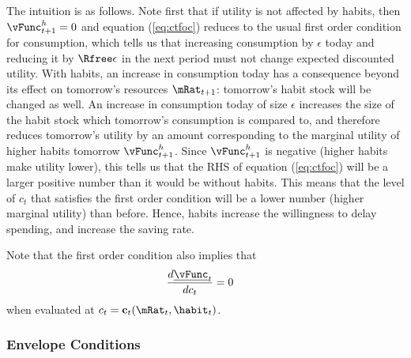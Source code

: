 The intuition is as follows.  Note first that if
utility is not affected by habits, then $\vFunc^{h}_{t+1}=0$ and equation
(\ref{eq:ctfoc}) reduces to the usual first order condition for
consumption, which tells us that increasing consumption by $\epsilon$
today and reducing it by $\Rfree \epsilon$ in the next period must not
change expected discounted utility.  With habits, an increase in
consumption today has a consequence beyond its effect on tomorrow's
resources $\mRat_{t+1}$: tomorrow's habit stock will be changed as well.
An increase in consumption today of size $\epsilon$ increases the size
of the habit stock which tomorrow's consumption is compared to, and
therefore reduces tomorrow's utility by an amount corresponding to the
marginal utility of higher habits tomorrow $\vFunc^{h}_{t+1}$.  Since
$\vFunc^{h}_{t+1}$ is negative (higher habits make utility lower), this
tells us that the RHS of equation (\ref{eq:ctfoc}) will be a larger
positive number than it would be without habits.  This means that the
level of $c_{t}$ that satisfies the first order condition will be a
lower number (higher marginal utility) than before.  Hence, habits
increase the willingness to delay spending, and increase the saving
rate.

Note that the first order condition also implies that
\begin{equation}\begin{gathered}\begin{aligned}
        \frac{d \underline{\vFunc}_{t}}{d c_{t}} & =  0
\end{aligned}\end{gathered}\end{equation}
when evaluated at $c_{t}=\mathbf{c}_{t}(\mRat_{t},\habit_{t})$.

\subsubsection{Envelope Conditions}

